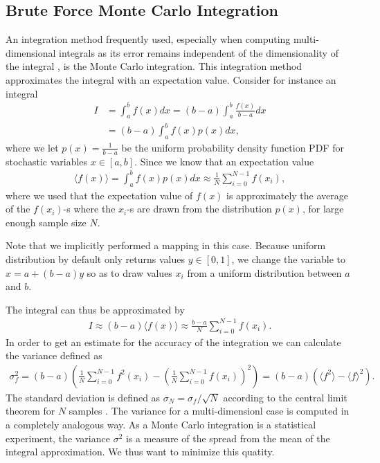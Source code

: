 \documentclass[10pt, twocolumn]{aastex62}
\begin{document}
\subsection{Brute Force Monte Carlo Integration}\label{subsec:brute_force_monte_carlo}
An integration method frequently used, especially when computing
multi-dimensional integrals as its error remains independent of the
dimensionality of the integral \citep[p. 343-344]{jensen:2015}, is the Monte Carlo integration. This integration method
approximates the integral with an expectation value. Consider for instance an
integral 
\begin{align}
	I &= \int^b_a f(x)dx = (b-a)\int^b_a\frac{f(x)}{b-a}dx \\	
	&= (b-a)\int^b_af(x)p(x)dx,
\end{align}
where we let $p(x) = \frac{1}{b-a}$ be the uniform probability density function
PDF for stochastic variables $x\in[a, b]$. Since we know that an expectation
value 
\begin{align}
	\langle f(x)\rangle = \int^b_a f(x)p(x)dx \approx \frac{1}{N}\sum_{i=0}^{N-1} f(x_i),
\end{align}
where we used that the expectation value of $f(x)$ is approximately the average
of the $f(x_i)$-s where the $x_i$-s are drawn from the distribution $p(x)$, for
large enough sample size $N$. 

Note that we implicitly performed a mapping in this case. Because uniform
distribution by default only returns values $y\in[0, 1]$, we change the variable
to $x = a + (b-a)y$ so as to draw values $x_i$ from a uniform distribution
between $a$ and $b$. 

The integral can thus be approximated by 
\begin{align}
	I \approx (b-a)\langle f(x) \rangle \approx \frac{b-a}{N}\sum^{N-1}_{i=0}f(x_i).
\end{align}
In order to get an estimate for the accuracy of the integration we can calculate
the variance defined as 
\begin{align}
	\sigma_f^2 = (b-a) \left(\frac{1}{N}\sum_{i=0}^{N-1} f^2(x_i) - \left(\frac{1}{N}\sum_{i=0}^{N-1}f(x_i)\right)^2\right) = (b-a)\left(\langle f^2\rangle - \langle f\rangle^2\right).
\end{align}
The standard deviation is defined as $\sigma_N = \sigma_f/\sqrt{N}$ according to the central
limit theorem for $N$ samples \citep[p. 343]{jensen:2015}. The variance for a multi-dimensionl case is computed in a completely
analogous way. As a Monte Carlo integration is a statistical experiment, the variance
$\sigma^2$ is a measure of the spread from the mean of the integral
approximation. We thus want to minimize this quatity.
\end{document}
